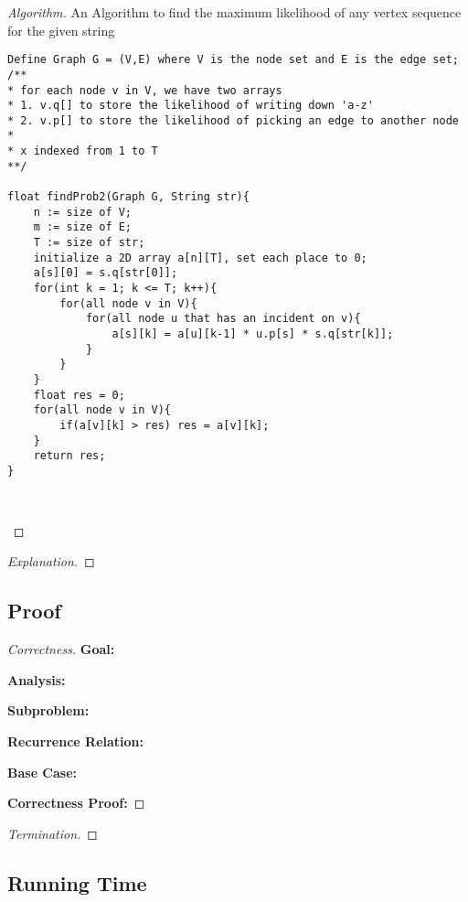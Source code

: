 \documentclass[openany]{article}
\begin{document}
\begin{proof}[Algorithm]{}
		\renewcommand{\qedsymbol}{}
		An Algorithm to find the maximum likelihood of any vertex sequence for the given string
		\begin{lstlisting}[basicstyle=\fontsize{8}{9}\selectfont\ttfamily]
Define Graph G = (V,E) where V is the node set and E is the edge set;
/**
* for each node v in V, we have two arrays
* 1. v.q[] to store the likelihood of writing down 'a-z'
* 2. v.p[] to store the likelihood of picking an edge to another node
*
* x indexed from 1 to T
**/

float findProb2(Graph G, String str){
    n := size of V;
    m := size of E;
    T := size of str;
    initialize a 2D array a[n][T], set each place to 0;
    a[s][0] = s.q[str[0]];
    for(int k = 1; k <= T; k++){
        for(all node v in V){
            for(all node u that has an incident on v){
                a[s][k] = a[u][k-1] * u.p[s] * s.q[str[k]];
            }
        }
    }
    float res = 0;
    for(all node v in V){
        if(a[v][k] > res) res = a[v][k];
    }
    return res;
}

        
		\end{lstlisting} 
\end{proof}



\begin{proof}[Explanation]{}
		\renewcommand{\qedsymbol}{} %
       
\end{proof}

\subsection*{Proof}
\begin{proof}[Correctness]{}
    
    
\textbf{Goal:} 

\textbf{Analysis:} 
    
\textbf{Subproblem:}

    
\textbf{Recurrence Relation:}
    
    
\textbf{Base Case:}
    
    
\textbf{Correctness Proof:}

    
  

\end{proof}
\begin{proof}[Termination]{}

\end{proof}

\subsection*{Running Time}
\end{document}
